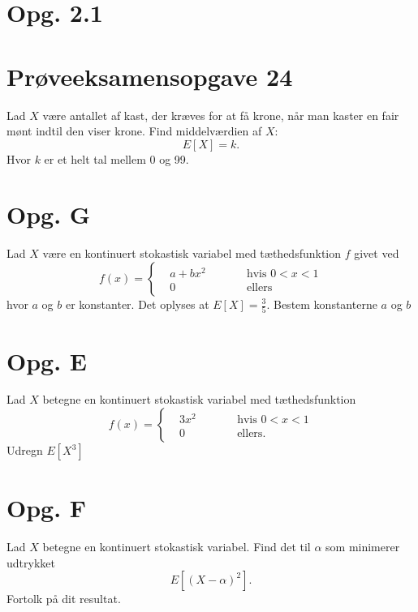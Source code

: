 \documentclass[12pt]{article}
\theoremstyle{definition}
\begin{document}
\section*{Opg. 2.1}

\section*{Prøveeksamensopgave 24}
Lad $X$ være antallet af kast, der kræves for at få krone, når man kaster en fair mønt indtil den viser krone. Find middelværdien af $X$:
\[ 
  E[X] = k
.\]
Hvor $k$ er et helt tal mellem 0 og 99.

\section*{Opg. G}
Lad $X$ være en kontinuert stokastisk variabel med tæthedsfunktion $f$ givet ved
\begin{equation*}
  f(x) = \left\{
    \begin{aligned}
      & a + bx^2 &\qquad &\text{hvis } 0 < x < 1 \\
      & 0 &\qquad &\text{ellers}
    \end{aligned}
  \right.
\end{equation*}
hvor $a$ og $b$ er konstanter. Det oplyses at $E[X] = \frac{3}{5}$. Bestem konstanterne $a$ og $b$


\section*{Opg. E}
Lad $X$ betegne en kontinuert stokastisk variabel med tæthedsfunktion
\begin{equation*}
  f(x) = \left\{
    \begin{aligned}
      & 3x^2 &\qquad &\text{hvis } 0 < x < 1 \\
      & 0 &\qquad &\text{ellers.}
    \end{aligned}
  \right.
\end{equation*}
Udregn $E \left[ X^3 \right]$

\section*{Opg. F}
Lad $X$ betegne en kontinuert stokastisk variabel. Find det til $\alpha$ som minimerer udtrykket
\[ 
E \left[ (X - \alpha)^2 \right]
.\]
Fortolk på dit resultat.
\end{document}
